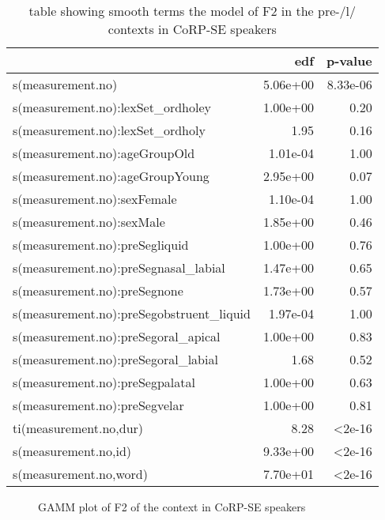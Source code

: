 \documentclass[../../../00.FullDoc/tex/Thesis]{subfiles}
\begin{document}
\begin{table}[htbp]
	\centering
	\begin{tabular}{lrr}
		\hline
		& edf & p-value \\
		\hline
		s(measurement.no) & 5.06e+00 & 8.33e-06 \\
		s(measurement.no):lexSet\_ordholey & 1.00e+00 &  0.20 \\
		s(measurement.no):lexSet\_ordholy & 1.95 & 0.16 \\
		s(measurement.no):ageGroupOld & 1.01e-04 & 1.00 \\
		s(measurement.no):ageGroupYoung & 2.95e+00 & 0.07 \\
		s(measurement.no):sexFemale & 1.10e-04 & 1.00 \\
		s(measurement.no):sexMale & 1.85e+00 & 0.46 \\
		s(measurement.no):preSegliquid & 1.00e+00 & 0.76 \\
		s(measurement.no):preSegnasal\_labial & 1.47e+00 & 0.65 \\
		s(measurement.no):preSegnone & 1.73e+00 & 0.57 \\
		s(measurement.no):preSegobstruent\_liquid & 1.97e-04 & 1.00 \\
		s(measurement.no):preSegoral\_apical & 1.00e+00 & 0.83 \\    
		s(measurement.no):preSegoral\_labial & 1.68 & 0.52 \\
		s(measurement.no):preSegpalatal & 1.00e+00 & 0.63 \\
		s(measurement.no):preSegvelar & 1.00e+00 & 0.81 \\
		ti(measurement.no,dur) & 8.28 & <2e-16 \\
		s(measurement.no,id) & 9.33e+00 & <2e-16 \\
		s(measurement.no,word) & 7.70e+01 & <2e-16 \\
		\hline
	\end{tabular}
	\caption{table showing smooth terms the model of F2 in the pre-/l/ contexts in CoRP-SE speakers}
	\label{tbl:goalF2SE-smooth}%
\end{table}

\begin{center}
	\begin{figure}[h]
		
		\caption{GAMM plot of F2 of the \goal{} context in CoRP-SE speakers} \label{fig:goalF2SE}
	\end{figure}
\end{center}
\end{document}
